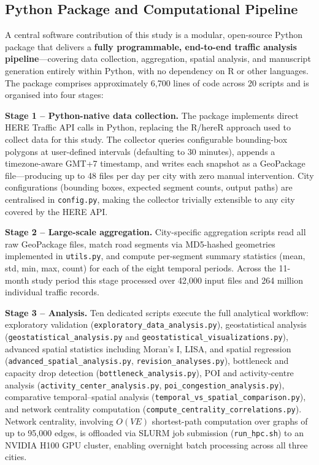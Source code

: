 \documentclass[12pt,a4paper]{article}
\begin{document}
\subsection{Python Package and Computational Pipeline}

A central software contribution of this study is a modular, open-source Python package that delivers a \textbf{fully programmable, end-to-end traffic analysis pipeline}---covering data collection, aggregation, spatial analysis, and manuscript generation entirely within Python, with no dependency on R or other languages. The package comprises approximately 6,700 lines of code across 20 scripts and is organised into four stages:

\textbf{Stage 1 -- Python-native data collection.} The package implements direct HERE Traffic API calls in Python, replacing the R/hereR approach used to collect data for this study. The collector queries configurable bounding-box polygons at user-defined intervals (defaulting to 30 minutes), appends a timezone-aware GMT+7 timestamp, and writes each snapshot as a GeoPackage file---producing up to 48 files per day per city with zero manual intervention. City configurations (bounding boxes, expected segment counts, output paths) are centralised in \texttt{config.py}, making the collector trivially extensible to any city covered by the HERE API.

\textbf{Stage 2 -- Large-scale aggregation.} City-specific aggregation scripts read all raw GeoPackage files, match road segments via MD5-hashed geometries implemented in \texttt{utils.py}, and compute per-segment summary statistics (mean, std, min, max, count) for each of the eight temporal periods. Across the 11-month study period this stage processed over 42,000 input files and 264 million individual traffic records.

\textbf{Stage 3 -- Analysis.} Ten dedicated scripts execute the full analytical workflow: exploratory validation (\texttt{exploratory\_data\_analysis.py}), geostatistical analysis (\texttt{geostatistical\_analysis.py} and \texttt{geostatistical\_visualizations.py}), advanced spatial statistics including Moran's I, LISA, and spatial regression (\texttt{advanced\_spatial\_analysis.py}, \texttt{revision\_analyses.py}), bottleneck and capacity drop detection (\texttt{bottleneck\_analysis.py}), POI and activity-centre analysis (\texttt{activity\_center\_analysis.py}, \texttt{poi\_congestion\_analysis.py}), comparative temporal--spatial analysis (\texttt{temporal\_vs\_spatial\_comparison.py}), and network centrality computation (\texttt{compute\_centrality\_correlations.py}). Network centrality, involving $O(VE)$ shortest-path computation over graphs of up to 95,000 edges, is offloaded via SLURM job submission (\texttt{run\_hpc.sh}) to an NVIDIA H100 GPU cluster, enabling overnight batch processing across all three cities.
\end{document}
